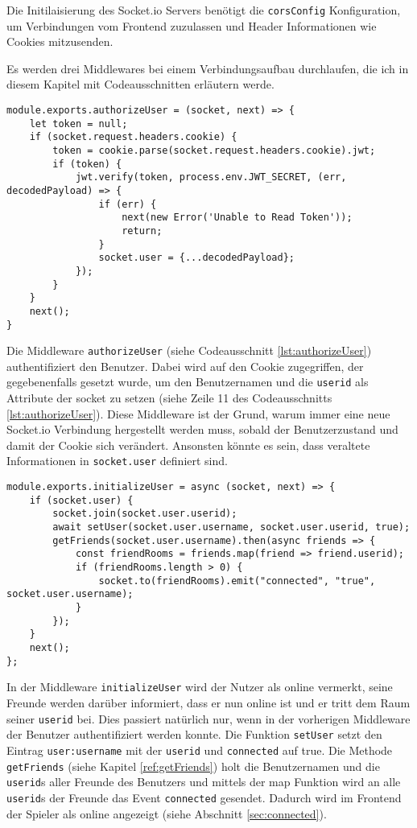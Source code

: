 Die Initilaisierung des Socket.io Servers benötigt die \verb|corsConfig| Konfiguration, um Verbindungen vom Frontend zuzulassen und Header Informationen wie Cookies mitzusenden.

Es werden drei Middlewares bei einem Verbindungsaufbau durchlaufen,  die ich in diesem Kapitel mit Codeausschnitten erläutern werde.


\begin{lstlisting}[style=codeStyle, caption={authorizeUser Middleware für Socket.io Verbinudngen}, label={lst:authorizeUser}]
module.exports.authorizeUser = (socket, next) => {
    let token = null;
    if (socket.request.headers.cookie) {
        token = cookie.parse(socket.request.headers.cookie).jwt;
        if (token) {
            jwt.verify(token, process.env.JWT_SECRET, (err, decodedPayload) => {
                if (err) {
                    next(new Error('Unable to Read Token'));
                    return;
                }
                socket.user = {...decodedPayload};
            });
        }
    }
    next();
}
\end{lstlisting}

Die Middleware \verb|authorizeUser| (siehe Codeausschnitt \ref{lst:authorizeUser}) authentifiziert den Benutzer. Dabei  wird auf den Cookie zugegriffen, der gegebenenfalls gesetzt wurde, um den Benutzernamen und die \verb|userid| als Attribute der socket zu setzen (siehe Zeile 11 des Codeausschnitts \ref{lst:authorizeUser}). Diese Middleware ist der Grund, warum immer eine neue Socket.io Verbindung hergestellt werden muss, sobald der Benutzerzustand und damit der Cookie sich verändert. Ansonsten könnte es sein, dass veraltete Informationen in \verb|socket.user| definiert sind.

\begin{lstlisting}[style=codeStyle, caption={initializeUser Middleware für Socket.io Verbinudngen}, label={lst:initializeUser}]
module.exports.initializeUser = async (socket, next) => {
    if (socket.user) {
        socket.join(socket.user.userid);
        await setUser(socket.user.username, socket.user.userid, true);
        getFriends(socket.user.username).then(async friends => {
            const friendRooms = friends.map(friend => friend.userid);
            if (friendRooms.length > 0) {
                socket.to(friendRooms).emit("connected", "true", socket.user.username);
            }
        });
    }
    next();
};
\end{lstlisting}

In der Middleware \verb|initializeUser| wird der Nutzer als online vermerkt, seine Freunde werden darüber informiert, dass er nun online ist und er tritt dem Raum seiner \verb|userid| bei. Dies passiert natürlich nur, wenn in der vorherigen Middleware der Benutzer authentifiziert werden konnte. Die Funktion \verb|setUser| setzt den Eintrag \verb|user:username| mit der \verb|userid| und \verb|connected| auf true. Die Methode \verb|getFriends| (siehe Kapitel \ref{ref:getFriends}) holt die Benutzernamen und die \verb|userid|s aller Freunde des Benutzers und mittels der map Funktion wird an alle \verb|userid|s der Freunde das Event \verb|connected| gesendet. Dadurch wird im Frontend der Spieler als online angezeigt (siehe Abschnitt \ref{sec:connected}). 

